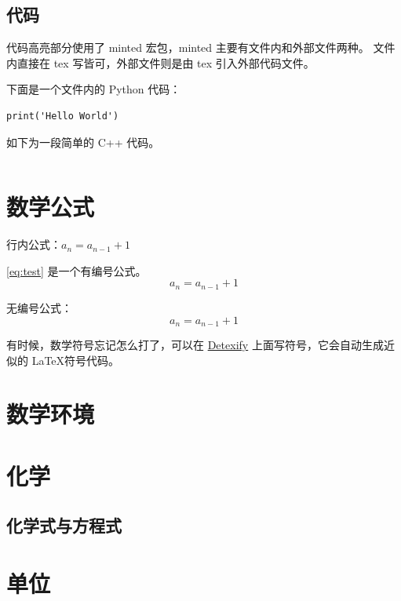 \subsection{代码}

代码高亮部分使用了 minted 宏包，minted 主要有文件内和外部文件两种。
文件内直接在 tex 写皆可，外部文件则是由 tex 引入外部代码文件。

下面是一个文件内的 Python 代码：
\begin{verbatim}
print('Hello World')
\end{verbatim}

如下为一段简单的 C++ 代码。
\inputminted{c++}{code/test.cpp}

\section{数学公式}

行内公式：$a_n = a_{n-1} + 1$

\autoref{eq:test} 是一个有编号公式。
\begin{equation}
    \label{eq:test}
    a_n = a_{n-1} + 1
\end{equation}

无编号公式：
$$
    a_n = a_{n-1} + 1
$$

有时候，数学符号忘记怎么打了，可以在 \href{http://detexify.kirelabs.org/classify.html}{Detexify} 上面写符号，它会自动生成近似的 \LaTeX 符号代码。

\section{数学环境}

\section{化学}

\subsection{化学式与方程式}








\section{单位}


